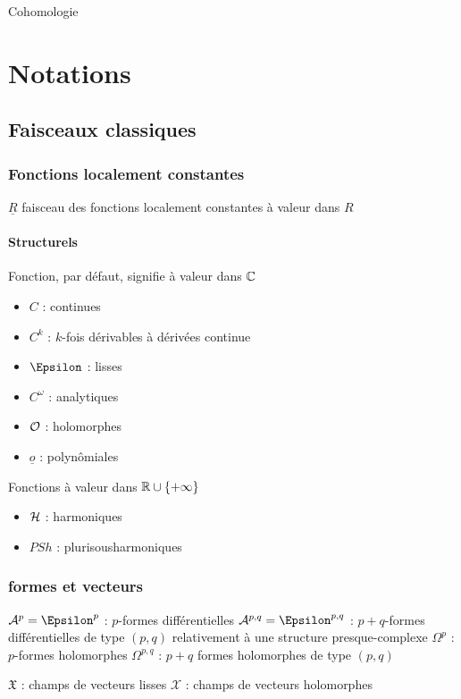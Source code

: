 Cohomologie

\chapter{Notations}
%

\section{Faisceaux classiques}

\subsection{Fonctions localement constantes}
$\underline{R}$ faisceau des fonctions localement constantes à valeur dans $R$

\subsubsection{Structurels}
Fonction, par défaut, signifie à valeur dans $\mathbb{C}$
\begin{itemize}
\item $C$ : continues
\item $C^k$ : $k$-fois dérivables à dérivées continue
\item $\Epsilon$ : lisses
\item $C^\omega$ : analytiques
\item $\mathcal{O}$ : holomorphes
\item $\underline{o}$ : polynômiales
\end{itemize}

Fonctions à valeur dans $\mathbb{R} \cup \{+\infty\}$
\begin{itemize}
\item $\mathcal{H}$ : harmoniques
\item $PSh$ : plurisousharmoniques
\end{itemize}

\subsection{formes et vecteurs}

$\mathcal{A}^p = \Epsilon^p$ : $p$-formes différentielles
$\mathcal{A}^{p,q} = \Epsilon^{p,q}$ : $p+q$-formes différentielles de type $(p,q)$ relativement à une structure presque-complexe
$\Omega^p$ : $p$-formes holomorphes
$\Omega^{p,q}$ : $p+q$ formes holomorphes de type $(p,q)$

$\mathfrak{X}$ : champs de vecteurs lisses
$\mathcal{X}$ : champs de vecteurs holomorphes

